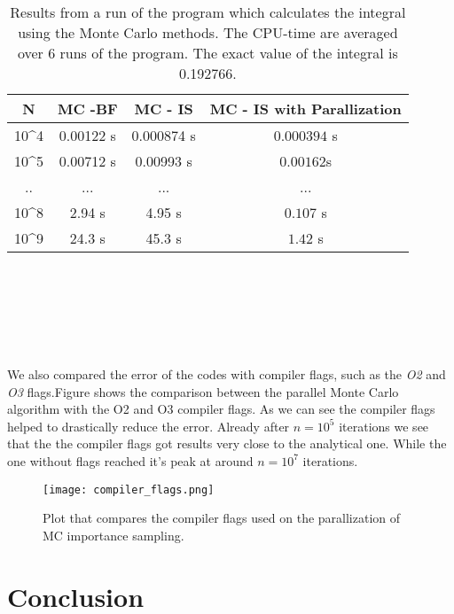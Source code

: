 \documentclass{article}
\begin{document}
		\begin{table}[h]
			\centering
			\caption{Results from a run of the program which calculates the integral using the Monte Carlo methods. The CPU-time are averaged over 6 runs of the program. The exact value of the integral is 0.192766.}
			\label{table: results brute force MC}
			\begin{tabular}{|c|c|c|c|}
\hline
\textbf{N} 	&	\textbf{MC -BF}	&	\textbf{MC - IS }	&	\textbf{MC - IS with Parallization} \\ \hline 
10^4 	&	0.00122 s	&	0.000874 s			&	$0.000394 $ s	\\ \hline
10^5 	&	0.00712 s	&	0.00993 s			&	$0.00162 $s	\\ \hline
.. 	&	...	&	...			&	...	                \\ \hline
10^8 	&	2.94 s	&	4.95 s			&	$0.107 $ s	\\ \hline
10^9 	&	24.3 s	&	45.3 s			&	$1.42 $ s	\\ \hline
			\end{tabular}
		\end{table}\\\\\\\\\

\newpage

We also compared the error of the codes with compiler flags,  such as the \textit{O2} and \textit{O3} flags.Figure \cite{fig: WHAT} shows the comparison between the parallel Monte Carlo algorithm with the O2 and O3 compiler flags. As we can see the compiler flags helped to drastically reduce the error. Already after $n=10^5$ iterations we see that the the compiler flags got results very close to the analytical one. While the one without flags reached it's peak at around $n=10^7$ iterations. \\

\begin{figure}[H]
	\centering
	\texttt{[image: compiler\_flags.png]}
	\caption{Plot that compares the compiler flags used on the parallization of MC importance sampling.}
	\label{fig: integration limits Gauss-Legendre}
\end{figure}



\section{Conclusion}
\end{document}
